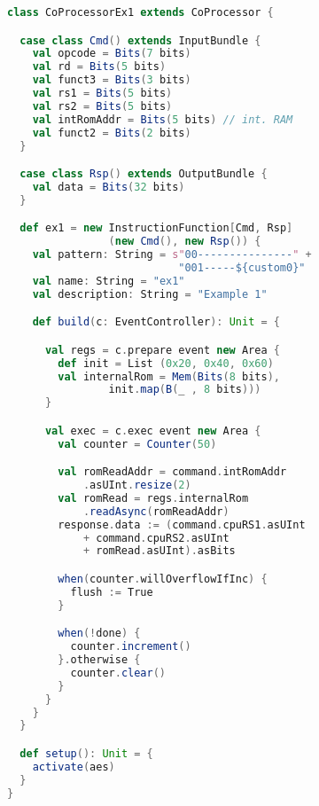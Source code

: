 \begin{lstlisting}[language=scala]
class CoProcessorEx1 extends CoProcessor {

  case class Cmd() extends InputBundle {
    val opcode = Bits(7 bits)
    val rd = Bits(5 bits)
    val funct3 = Bits(3 bits)
    val rs1 = Bits(5 bits)
    val rs2 = Bits(5 bits)
    val intRomAddr = Bits(5 bits) // int. RAM
    val funct2 = Bits(2 bits)
  }

  case class Rsp() extends OutputBundle {
    val data = Bits(32 bits)
  }

  def ex1 = new InstructionFunction[Cmd, Rsp]
                (new Cmd(), new Rsp()) {
    val pattern: String = s"00---------------" + 
                           "001-----${custom0}"
    val name: String = "ex1"
    val description: String = "Example 1"

    def build(c: EventController): Unit = {

      val regs = c.prepare event new Area {
        def init = List (0x20, 0x40, 0x60)
        val internalRom = Mem(Bits(8 bits), 
                init.map(B(_ , 8 bits)))
      }

      val exec = c.exec event new Area {
        val counter = Counter(50)

        val romReadAddr = command.intRomAddr
            .asUInt.resize(2)
        val romRead = regs.internalRom
            .readAsync(romReadAddr)
        response.data := (command.cpuRS1.asUInt 
            + command.cpuRS2.asUInt 
            + romRead.asUInt).asBits

        when(counter.willOverflowIfInc) {
          flush := True
        }

        when(!done) {
          counter.increment()
        }.otherwise {
          counter.clear()
        }
      }
    }
  }

  def setup(): Unit = {
    activate(aes)
  }
}
\end{lstlisting}
